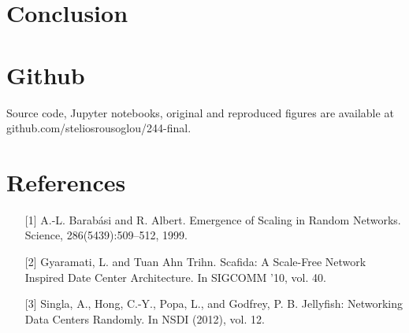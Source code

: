 \section{Conclusion}

\section{Github}

Source code, Jupyter notebooks, original and reproduced figures are available at github.com/steliosrousoglou/244-final.

\section{References}

\begin{itemize}[leftmargin=0pt]
       \item[] [1] A.-L. Barabási and R. Albert. Emergence of Scaling in Random Networks. Science, 286(5439):509–512, 1999.
       \vspace{4pt}
  \item[] [2] Gyaramati, L. and Tuan Ahn Trihn. Scafida: A Scale-Free Network Inspired Date Center Architecture. In SIGCOMM '10, vol. 40.
  \vspace{4pt}
  \item[] [3] Singla, A., Hong, C.-Y., Popa, L., and Godfrey, P. B. Jellyfish: Networking Data Centers Randomly. In NSDI (2012), vol. 12.
    \end{itemize}

